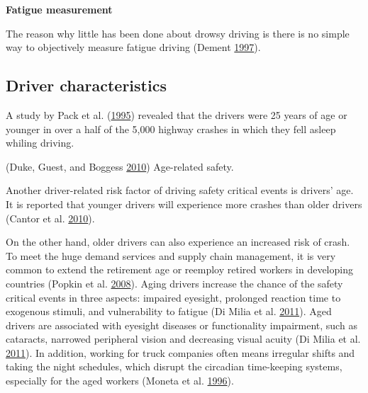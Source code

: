 \documentclass[12pt]{book}
\numberwithin{equation}{chapter}
\begin{document}
\textbf{Fatigue measurement}

The reason why little has been done about drowsy driving is there is no simple way to objectively measure fatigue driving (Dement \protect\hyperlink{ref-dement1997perils}{1997}).

\hypertarget{driver-characteristics}{%
\subsection{Driver characteristics}\label{driver-characteristics}}

A study by Pack et al. (\protect\hyperlink{ref-pack1995characteristics}{1995}) revealed that the drivers were 25 years of age or younger in over a half of the 5,000 highway crashes in which they fell asleep whiling driving.

(Duke, Guest, and Boggess \protect\hyperlink{ref-duke2010age}{2010}) Age-related safety.

Another driver-related risk factor of driving safety critical events is drivers' age. It is reported that younger drivers will experience more crashes than older drivers (Cantor et al. \protect\hyperlink{ref-cantor2010driver}{2010}).

On the other hand, older drivers can also experience an increased risk of crash. To meet the huge demand services and supply chain management, it is very common to extend the retirement age or reemploy retired workers in developing countries (Popkin et al. \protect\hyperlink{ref-popkin2008age}{2008}). Aging drivers increase the chance of the safety critical events in three aspects: impaired eyesight, prolonged reaction time to exogenous stimuli, and vulnerability to fatigue (Di Milia et al. \protect\hyperlink{ref-di2011demographic}{2011}). Aged drivers are associated with eyesight diseases or functionality impairment, such as cataracts, narrowed peripheral vision and decreasing visual acuity (Di Milia et al. \protect\hyperlink{ref-di2011demographic}{2011}). In addition, working for truck companies often means irregular shifts and taking the night schedules, which disrupt the circadian time-keeping systems, especially for the aged workers (Moneta et al. \protect\hyperlink{ref-moneta1996time}{1996}).
\end{document}

